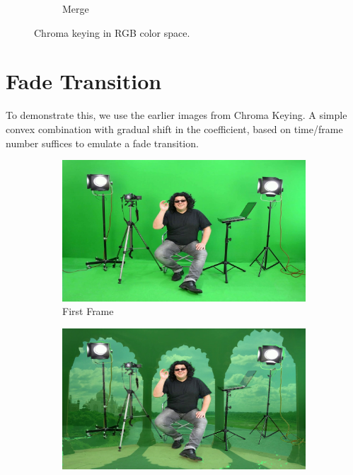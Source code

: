 \documentclass[a4paper]{article}
\begin{document}
\begin{figure}[H]
\begin{subfigure}[b]{.3\textwidth}
        \caption{Merge}
    \end{subfigure}
    \hfill
    \caption{Chroma keying in RGB color space.}
    \label{fig:chroma_keying}
\end{figure}

\section{Fade Transition}

To demonstrate this, we use the earlier images from Chroma Keying. A simple convex combination with gradual shift in the coefficient, based on time/frame number suffices to emulate a fade transition.

\begin{figure}[H]
    \hfill
    \centering
    \begin{subfigure}[b]{.3\textwidth}
        \centering
        \includegraphics[width=\textwidth]{output/fade_transition_1.jpg}
        \caption{First Frame}
    \end{subfigure}
    \hfill
    \begin{subfigure}[b]{.3\textwidth}
        \centering
        \includegraphics[width=\textwidth]{output/fade_transition_13.jpg}

\end{subfigure}
\end{figure}
\end{document}
